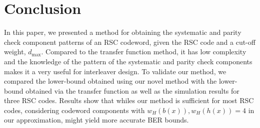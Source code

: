 \section{Conclusion}
\label{sec6}
 



In this paper, we presented a method for  obtaining the systematic and parity check component patterns of an RSC codeword, given the RSC code and a cut-off weight, $d_{\text{max}}$.
Compared to the transfer function method, it has low complexity and the knowledge of the pattern of the systematic and parity check components makes it a very useful for interleaver design. To validate our method, we compared the lower-bound obtained using our novel method with the lower-bound obtained via the transfer function as well as the simulation results for three RSC codes. Results show that whiles our method is sufficient for most RSC codes, considering codeword components with $w_H(b(x)), w_H(h(x)) =4$ in our approximation, might yield more accurate BER bounds.
